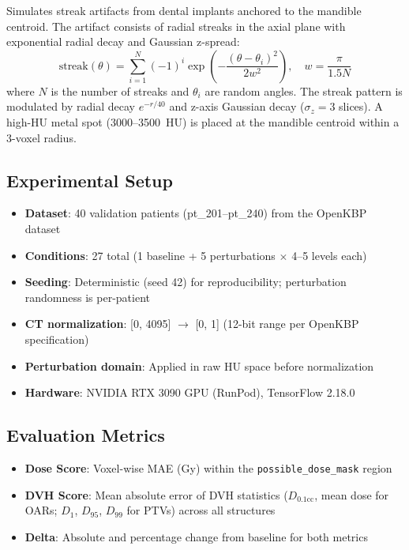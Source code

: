 \documentclass[11pt,a4paper]{article}
\begin{document}
Simulates streak artifacts from dental implants anchored to the mandible centroid. The artifact consists of radial streaks in the axial plane with exponential radial decay and Gaussian z-spread:
\begin{equation}
\text{streak}(\theta) = \sum_{i=1}^{N} (-1)^i \exp\!\left(-\frac{(\theta - \theta_i)^2}{2w^2}\right), \quad w = \frac{\pi}{1.5N}
\end{equation}
where $N$ is the number of streaks and $\theta_i$ are random angles. The streak pattern is modulated by radial decay $e^{-r/40}$ and z-axis Gaussian decay ($\sigma_z = 3$ slices). A high-HU metal spot (3000--3500~HU) is placed at the mandible centroid within a 3-voxel radius.

\subsection{Experimental Setup}

\begin{itemize}
    \item \textbf{Dataset}: 40 validation patients (pt\_201--pt\_240) from the OpenKBP dataset
    \item \textbf{Conditions}: 27 total (1 baseline + 5 perturbations $\times$ 4--5 levels each)
    \item \textbf{Seeding}: Deterministic (seed 42) for reproducibility; perturbation randomness is per-patient
    \item \textbf{CT normalization}: [0, 4095] $\rightarrow$ [0, 1] (12-bit range per OpenKBP specification)
    \item \textbf{Perturbation domain}: Applied in raw HU space before normalization
    \item \textbf{Hardware}: NVIDIA RTX 3090 GPU (RunPod), TensorFlow 2.18.0
\end{itemize}

\subsection{Evaluation Metrics}

\begin{itemize}
    \item \textbf{Dose Score}: Voxel-wise MAE (Gy) within the \texttt{possible\_dose\_mask} region
    \item \textbf{DVH Score}: Mean absolute error of DVH statistics ($D_{0.1\text{cc}}$, mean dose for OARs; $D_1$, $D_{95}$, $D_{99}$ for PTVs) across all structures
    \item \textbf{Delta}: Absolute and percentage change from baseline for both metrics
\end{itemize}
\end{document}
